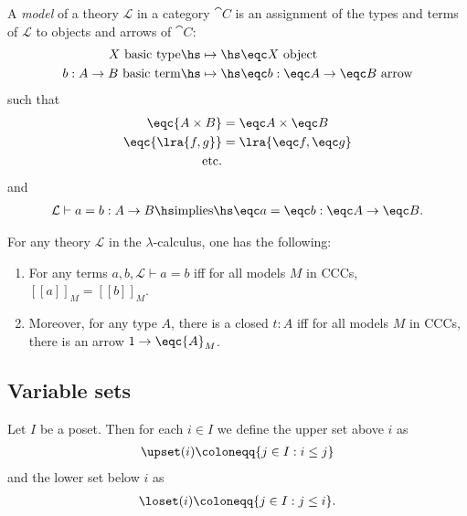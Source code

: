 \documentclass{article}
\begin{document}
\begin{definition}[Awodey p. 138]
    A \emph{model} of a theory $\mathcal{L}$ in a category $\cat C$
    is an assignment of the types and terms of $\mathcal{L}$ to objects
    and arrows of $\cat C$:
    \begin{align*}
        X\text{ basic type} \hs
         & \mapsto\hs\eqc X \text{ object}                   \\
        b:A\to B\text{ basic term} \hs
         & \mapsto\hs \eqc b: \eqc A \to \eqc B\text{ arrow}
    \end{align*}
    such that
    \begin{align*}
        \eqc{A\times B} & = \eqc A \times \eqc B \\
        \eqc{\lra{f,g}} & = \lra{\eqc f, \eqc g} \\
        \text{etc.}
    \end{align*}
    and
    \begin{align*}
        \mathcal{L}\vdash a = b : A \to B \hs\text{implies}\hs
        \eqc a = \eqc b : \eqc A \to \eqc B.
    \end{align*}
\end{definition}

\begin{proposition}[Awodey p. 139]
    For any theory $\mathcal{L}$ in the $\lambda$-calculus, one has the
    following:
    \begin{enumerate}
        \item For any terms $a,b,\mathcal{L}\vdash a = b$ iff
              for all models $M$ in CCCs, $[\![a]\!]_M=[\![b]\!]_M$.
        \item Moreover, for any type $A$, there is a closed $t:A$ iff for all models $M$ in CCCs, there is an arrow $1\to\eqc{A}_M$.
    \end{enumerate}
\end{proposition}

\subsection{Variable sets}

\begin{definition}
    Let $I$ be a poset. Then for each $i\in I$ we define
    the upper set above $i$ as
    \begin{align*}
        \upset(i) \coloneqq \{j\in I : i\leq j\}
    \end{align*}
    and the lower set below $i$ as
    \begin{align*}
        \loset(i) \coloneqq \{j\in I : j\leq i\}.
    \end{align*}
\end{definition}
\end{document}
